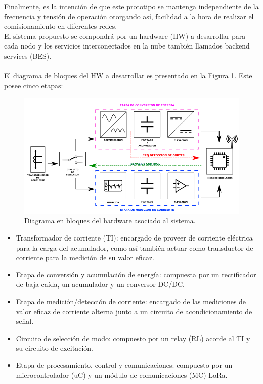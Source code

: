 \documentclass[11pt]{charter}
\begin{document}
Finalmente, es la intención de que este prototipo se mantenga independiente de la frecuencia y tensión de operación otorgando así, facilidad a la hora de realizar el comisionamiento en diferentes redes.\\

El sistema propuesto se compondrá por un hardware (HW) a desarrollar para cada nodo y los servicios interconectados en la nube también llamados backend services (BES).\\
\label{sec:diagrama_de_bloques_HW}\\
El diagrama de bloques del HW a desarrollar es presentado en la Figura \ref{fig:diagBloques}. Este posee cinco etapas:
\vspace{25px}
\begin{figure}[H]
	\centering 
	\includegraphics[width=\textwidth]{./Figuras/HW_block_diagram.png}
	\caption{Diagrama en bloques del hardware asociado al sistema.}
	\label{fig:diagBloques}
\end{figure}
\vspace{15px}
\begin{itemize}
	\item Transformador de corriente (TI): encargado de proveer de corriente eléctrica para la carga del acumulador, como así también actuar como  transductor de corriente para la medición de su valor eficaz.\\

	\item Etapa de conversión y acumulación de energía: compuesta por un rectificador de baja caída, un acumulador y un conversor DC/DC.\\

	\item Etapa de medición/detección de corriente: encargado de las mediciones de valor eficaz de corriente alterna junto a un circuito de acondicionamiento de señal.\\

	\item Circuito de selección de modo: compuesto por un relay (RL) acorde al TI y su circuito de excitación.\\

	\item Etapa de procesamiento, control y comunicaciones: compuesto por un microcontrolador (uC) y un módulo de comunicaciones (MC) LoRa.\\
\end{itemize}
\end{document}
